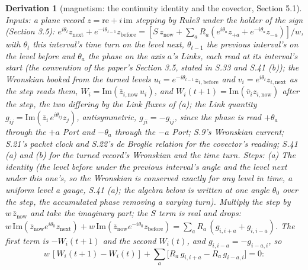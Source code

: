 \documentclass[pdflatex,sn-mathphys-num]{sn-jnl}
\theoremstyle{thmstyleone}
\newtheorem{derivation}{Derivation}
\begin{document}
\begin{derivation}[magnetism: the continuity identity and the covector, Section 5.1]
\emph{Inputs:} a plane record $z = \mathrm{re} + i\,\mathrm{im}$ stepping by Rule3 under the holder of the sign (Section 3.5): $e^{i\theta_t} z_{\mathrm{next}} + e^{-i\theta_{t-1}} z_{\mathrm{before}} = [S\,z_{\mathrm{now}} + \sum_a R_a (e^{i\theta_a} z_{+a} + e^{-i\theta_a} z_{-a})] / w$, with $\theta_t$ this interval's time turn on the level next, $\theta_{t-1}$ the previous interval's on the level before and $\theta_a$ the phase on the axis $a$'s Links, each read at its interval's start (the convention of the paper's Section 3.5, stated in S.33 and S.41 (b)); the Wronskian booked from the turned levels $u_i = e^{-i\theta_{t-1}} z_{i,\mathrm{before}}$ and $v_i = e^{i\theta_t} z_{i,\mathrm{next}}$ as the step reads them, $W_i = \mathrm{Im}(\bar z_{i,\mathrm{now}}\, u_i)$, and $W_i(t + 1) = \mathrm{Im}(\bar v_i z_{i,\mathrm{now}})$ after the step, the two differing by the Link fluxes of (a); the Link quantity $g_{ij} = \mathrm{Im}(\bar z_i\, e^{i\theta_{ij}} z_j)$, antisymmetric, $g_{ji} = -g_{ij}$, since the phase is read $+\theta_a$ through the $+a$ Port and $-\theta_a$ through the $-a$ Port; S.9's Wronskian current; S.21's packet clock and S.22's de Broglie relation for the covector's reading; S.41 (a) and (b) for the turned record's Wronskian and the time turn. \emph{Steps:} (a) \emph{The identity} (the level before under the previous interval's angle and the level next under this one's, so the Wronskian is conserved exactly for any level in time, a uniform level a gauge, S.41 (a); the algebra below is written at one angle $\theta_0$ over the step, the accumulated phase removing a varying turn). Multiply the step by $w\,\bar z_{\mathrm{now}}$ and take the imaginary part; the $S$ term is real and drops: $w\,\mathrm{Im}(\bar z_{\mathrm{now}} e^{i\theta_0} z_{\mathrm{next}}) + w\,\mathrm{Im}(\bar z_{\mathrm{now}} e^{-i\theta_0} z_{\mathrm{before}}) = \sum_a R_a\,(g_{i,i+a} + g_{i,i-a})$. The first term is $-W_i(t+1)$ and the second $W_i(t)$, and $g_{i,i-a} = -g_{i-a,i}$, so
\[
w\,[W_i(t+1) - W_i(t)] + \sum_a \bigl[R_a\,g_{i,i+a} - R_a\,g_{i-a,i}\bigr] = 0 :
\]

\end{derivation}
\end{document}

